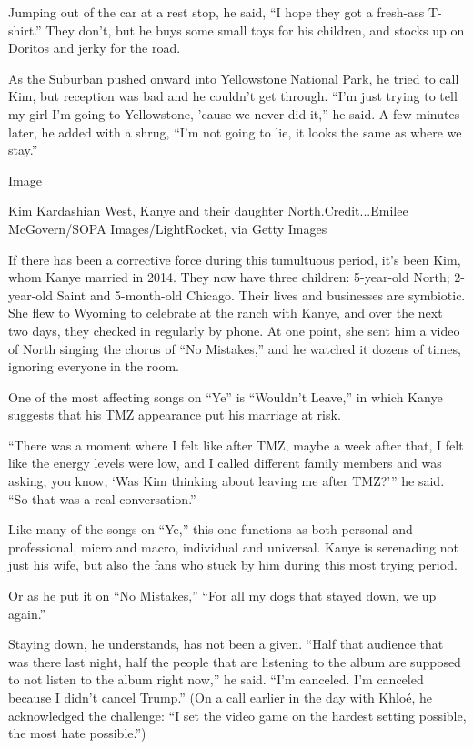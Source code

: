 Jumping out of the car at a rest stop, he said, ``I hope they got a
fresh-ass T-shirt.'' They don't, but he buys some small toys for his
children, and stocks up on Doritos and jerky for the road.

As the Suburban pushed onward into Yellowstone National Park, he tried
to call Kim, but reception was bad and he couldn't get through. ``I'm
just trying to tell my girl I'm going to Yellowstone, 'cause we never
did it,'' he said. A few minutes later, he added with a shrug, ``I'm not
going to lie, it looks the same as where we stay.''

Image

Kim Kardashian West, Kanye and their daughter North.Credit...Emilee
McGovern/SOPA Images/LightRocket, via Getty Images

If there has been a corrective force during this tumultuous period, it's
been Kim, whom Kanye married in 2014. They now have three children:
5-year-old North; 2-year-old Saint and 5-month-old Chicago. Their lives
and businesses are symbiotic. She flew to Wyoming to celebrate at the
ranch with Kanye, and over the next two days, they checked in regularly
by phone. At one point, she sent him a video of North singing the chorus
of ``No Mistakes,'' and he watched it dozens of times, ignoring everyone
in the room.

One of the most affecting songs on ``Ye'' is ``Wouldn't Leave,'' in
which Kanye suggests that his TMZ appearance put his marriage at risk.

``There was a moment where I felt like after TMZ, maybe a week after
that, I felt like the energy levels were low, and I called different
family members and was asking, you know, `Was Kim thinking about leaving
me after TMZ?''' he said. ``So that was a real conversation.''

Like many of the songs on ``Ye,'' this one functions as both personal
and professional, micro and macro, individual and universal. Kanye is
serenading not just his wife, but also the fans who stuck by him during
this most trying period.

Or as he put it on ``No Mistakes,'' ``For all my dogs that stayed down,
we up again.''

Staying down, he understands, has not been a given. ``Half that audience
that was there last night, half the people that are listening to the
album are supposed to not listen to the album right now,'' he said.
``I'm canceled. I'm canceled because I didn't cancel Trump.'' (On a call
earlier in the day with Khloé, he acknowledged the challenge: ``I set
the video game on the hardest setting possible, the most hate
possible.'')

